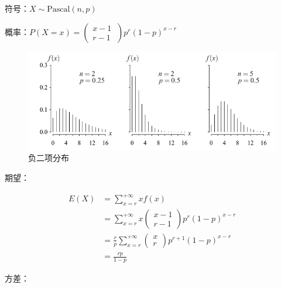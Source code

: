 \documentclass[12pt, a4paper, oneside]{ctexbook}
\begin{document}
 符号：$X \sim \text{Pascal}(n, p)$

 概率：$P(X = x) = \begin{pmatrix} x - 1\ \\ r - 1\end{pmatrix}p^{r}(1  -p)^{x - r}$

\begin{figure}[H]
  \centering
  \includegraphics[width=1\textwidth]{image/负二项分布.png}
  \caption{负二项分布}
  \label{fig:example}
\end{figure}

 期望：

$$
\begin{aligned}
E(X) &= \sum\limits_{x = r}^{+\infty} x f(x) \\
&= \sum\limits_{x = r}^{+\infty} x\begin{pmatrix} x - 1 \\ r - 1\end{pmatrix} p^{r}(1 - p)^{x - r} \\
&= \frac{r}{p} \sum\limits_{x = r}^{+\infty} \begin{pmatrix}x  \\ r \end{pmatrix} p^{r + 1} (1 - p)^{x  - r} \\
&= \frac{rp}{1 - p}
\end{aligned}
$$

 方差：
\end{document}
